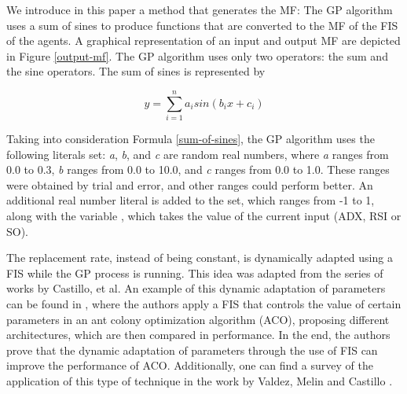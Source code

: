 \documentclass[a4paper,twoside]{article}
\begin{document}


We introduce in this paper a method  that generates the MF: The GP algorithm uses a sum of
sines to produce functions that are converted to the MF of the FIS of
the agents. A graphical representation of an input and output MF 
are depicted in Figure \ref{output-mf}. The GP algorithm uses only two operators: the sum and
the sine operators. The sum of sines is represented by

\begin{equation} \label{sum-of-sines}
  y = \sum_{i=1}^{n} a_{i} sin(b_{i}x + c_{i})
\end{equation}

Taking into consideration Formula \ref{sum-of-sines}, the GP algorithm
uses the following literals set: \textit{a}, \textit{b}, and
\textit{c} are random real numbers, where \textit{a} ranges from 0.0
to 0.3, \textit{b} ranges from 0.0 to 10.0, and \textit{c} ranges from
0.0 to 1.0. These ranges were obtained by trial and error, and other
ranges could perform better. An additional real number literal is
added to the set, which ranges from -1 to 1, along with the variable
, which takes the value of the current input (ADX, RSI or
SO). 


The replacement rate, instead of being constant, is
dynamically adapted using a FIS while the GP process is running. This
idea was adapted from the series of works by Castillo, et al. An
example of this dynamic adaptation of parameters can be found in
\cite{castillo2015new}, where the authors apply a FIS that controls
the value of certain parameters in an ant colony optimization
algorithm (ACO), proposing different architectures, which are then
compared in performance. In the end, the authors
prove that the dynamic adaptation of parameters through the use of FIS
can improve the performance of ACO. Additionally, one can find a
survey of the application of this type of technique in the work by
Valdez, Melin and Castillo \cite{valdez2014survey}. 
\end{document}
